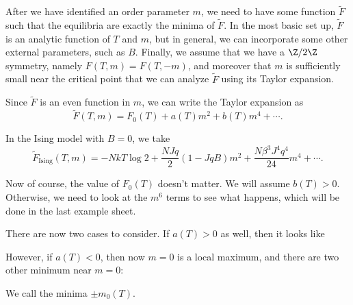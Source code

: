 \documentclass[a4paper]{article}
\begin{document}
%
%
After we have identified an order parameter $m$, we need to have some function $\tilde{F}$ such that the equilibria are exactly the minima of $\tilde{F}$. In the most basic set up, $\tilde{F}$ is an analytic function of $T$ and $m$, but in general, we can incorporate some other external parameters, such as $B$. Finally, we assume that we have a $\Z/2\Z$ symmetry, namely $F(T, m) = F(T, -m)$, and moreover that $m$ is sufficiently small near the critical point that we can analyze $\tilde{F}$ using its Taylor expansion.

Since $\tilde{F}$ is an even function in $m$, we can write the Taylor expansion as
\[
  \tilde{F} (T, m) = F_0(T) + a(T) m^2 + b(T) m^4 + \cdots.
\]
\begin{eg}
  In the Ising model with $B = 0$, we take
  \[
    \tilde{F}_{\mathrm{Ising}} (T, m) = -Nk T \log 2 + \frac{NJq}{2} (1 - JqB) m^2 + \frac{N\beta^3 J^4 q^4}{24} m^4 + \cdots.
  \]
\end{eg}
Now of course, the value of $F_0(T)$ doesn't matter. We will assume $b(T) > 0$. Otherwise, we need to look at the $m^6$ terms to see what happens, which will be done in the last example sheet.

There are now two cases to consider. If $a(T) > 0$ as well, then it looks like
\begin{center}
\end{center}
However, if $a(T) < 0$, then now $m = 0$ is a local maximum, and there are two other minimum near $m = 0$:
\begin{center}
\end{center}
We call the minima $\pm m_0(T)$.
\end{document}
